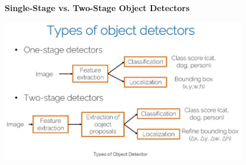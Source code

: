 \documentclass{beamer}
\begin{document}
\begin{frame}{\textbf{Single-Stage vs. Two-Stage Object Detectors}}
  \begin{center}
      \includegraphics[width=0.8\textwidth]{slide2.png} %
  \end{center}
\end{frame}
\end{document}
